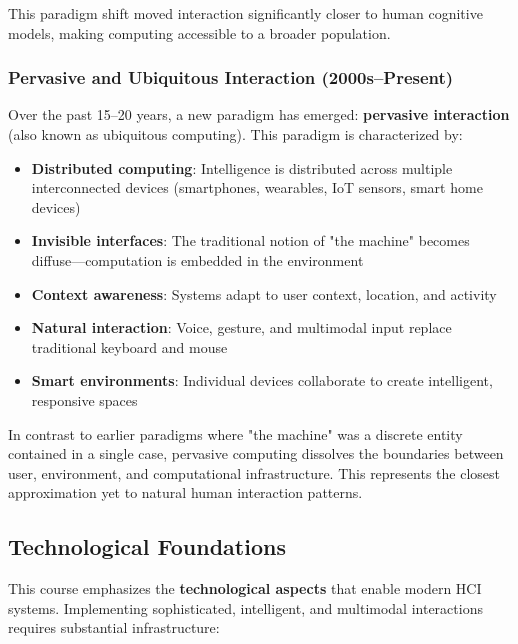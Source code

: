 \documentclass[11pt,a4paper]{article}
\theoremstyle{definition}
\theoremstyle{plain}
\theoremstyle{remark}
\begin{document}
This paradigm shift moved interaction significantly closer to human cognitive models, making computing accessible to a broader population.

\subsubsection{Pervasive and Ubiquitous Interaction (2000s–Present)}

\begin{tcolorbox}[colback=purple!5!white,colframe=purple!75!black,title=\textbf{Pervasive and Ubiquitous Computing}]
Over the past 15–20 years, a new paradigm has emerged: \textbf{pervasive interaction} (also known as ubiquitous computing). This paradigm is characterized by:
\begin{itemize}
    \item \textbf{Distributed computing}: Intelligence is distributed across multiple interconnected devices (smartphones, wearables, IoT sensors, smart home devices)
    \item \textbf{Invisible interfaces}: The traditional notion of "the machine" becomes diffuse—computation is embedded in the environment
    \item \textbf{Context awareness}: Systems adapt to user context, location, and activity
    \item \textbf{Natural interaction}: Voice, gesture, and multimodal input replace traditional keyboard and mouse
    \item \textbf{Smart environments}: Individual devices collaborate to create intelligent, responsive spaces
\end{itemize}
\end{tcolorbox}

In contrast to earlier paradigms where "the machine" was a discrete entity contained in a single case, pervasive computing dissolves the boundaries between user, environment, and computational infrastructure. This represents the closest approximation yet to natural human interaction patterns.

\subsection{Technological Foundations}

This course emphasizes the \textbf{technological aspects} that enable modern HCI systems. Implementing sophisticated, intelligent, and multimodal interactions requires substantial infrastructure:
\end{document}
